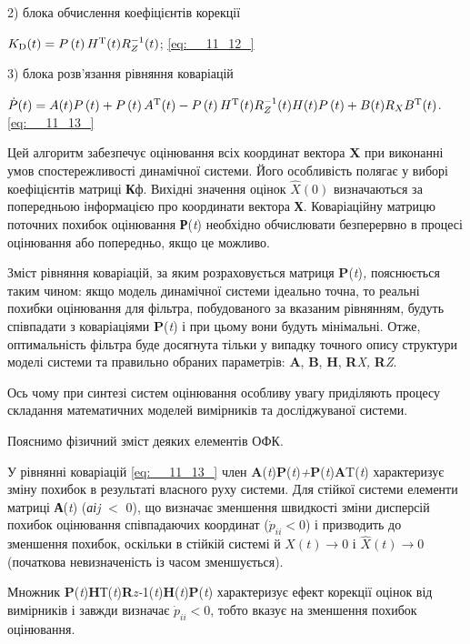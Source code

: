 2) блока обчислення коефіцієнтів корекції 

$K_{{\rm D}} (t)=P\left(t\right)H^{{\rm T}} (t)R_{Z} ^{-1} (t)$;                                    \eqref{eq:__11_12_}

3) 
блока розв'язання рівняння коваріацій

$\dot{P}(t)=A(t)P\left(t\right)+P\left(t\right)A^{{\rm T}} (t)-P\left(t\right)H^{{
\rm T}} (t)R_{Z}^{-1} (t)H(t)P\left(t\right)+B(t)R_{X} B^{{\rm T}} (t)$.\eqref{eq:__11_13_}

Цей 
алгоритм забезпечує оцінювання всіх координат вектора \textbf{X} при виконанні умов 
спостережливості динамічної системи. Його особливість полягає у виборі коефіцієнтів 
матриці \textbf{К}ф. Вихідні значення оцінок  $\hat{X}\left(0\right)$ визначаються 
за попередньою інформацією про координати вектора \textbf{Х}. Коваріаційну матрицю 
поточних похибок оцінювання \textbf{Р}(\textit{t}) необхідно обчислювати безперервно 
в процесі оцінювання або попередньо, якщо це можливо.

Зміст рівняння коваріацій, за яким розраховується матриця \textbf{P}(\textit{t})\textit{,} пояснюється 
таким чином: якщо модель динамічної системи ідеально точна, то реальні похибки оцінювання 
для фільтра, побудованого за вказаним рівнянням, будуть співпадати з коваріаціями \textbf{P}(\textit{t})\textit{ }і 
при цьому вони будуть мінімальні. Отже, оптимальність фільтра буде досягнута тільки 
у випадку точного опису структури моделі системи та правильно обраних параметрів: \textbf{A}, \textbf{B}, \textbf{H}, \textbf{R}\textit{X, }\textbf{R}\textit{Z}.

Ось 
чому при синтезі систем оцінювання особливу увагу приділяють процесу складання математичних 
моделей вимірників та досліджуваної системи.

Пояснимо фізичний зміст деяких елементів ОФК.    

У рівнянні коваріацій \eqref{eq:__11_13_} член \textbf{A}(\textit{t})\textbf{P}(\textit{t})\textit{+}\textbf{P}(\textit{t})\textbf{A}T(\textit{t}) 
характеризує зміну похибок в результаті власного руху системи. Для стійкої системи 
елементи матриці \textbf{А}(\textit{t}) (\textit{аіj }$<$ 0), що визначає зменшення 
швидкості зміни  дисперсій похибок оцінювання співпадаючих координат ($\dot{p}_{ii} 
<0$) і призводить до зменшення похибок, оскільки в стійкій\textbf{ }системі й $X(t)
\to 0$ і $\hat{X}(t)\to 0$ (початкова невизначеність із часом зменшується). 

Множник \textbf{P}(\textit{t})\textbf{H}Т(\textit{t})\textbf{R}\textit{z-}1(\textit{t})\textbf{H}(\textit{t})\textbf{P}(\textit{t}) 
характеризує ефект корекції оцінок від вимірників і завжди визначає $\dot{p}_{ii} 
<0$, тобто вказує на зменшення похибок оцінювання. 


